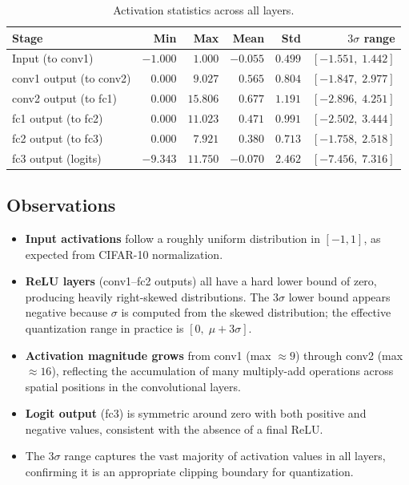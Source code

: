 \documentclass[11pt, letterpaper]{article}
\begin{document}
\begin{table}[H]
  \centering
  \caption{Activation statistics across all layers.}
  \label{tab:activations}
  \begin{tabular}{lrrrrr}
    \toprule
    \textbf{Stage} & \textbf{Min} & \textbf{Max}
                   & \textbf{Mean} & \textbf{Std}
                   & \textbf{$3\sigma$ range} \\
    \midrule
    Input (to conv1)         & $-1.000$ & $1.000$  & $-0.055$ & $0.499$ & $[-1.551,\;1.442]$ \\
    conv1 output (to conv2)  & $0.000$  & $9.027$  & $0.565$  & $0.804$ & $[-1.847,\;2.977]$ \\
    conv2 output (to fc1)    & $0.000$  & $15.806$ & $0.677$  & $1.191$ & $[-2.896,\;4.251]$ \\
    fc1 output (to fc2)      & $0.000$  & $11.023$ & $0.471$  & $0.991$ & $[-2.502,\;3.444]$ \\
    fc2 output (to fc3)      & $0.000$  & $7.921$  & $0.380$  & $0.713$ & $[-1.758,\;2.518]$ \\
    fc3 output (logits)      & $-9.343$ & $11.750$ & $-0.070$ & $2.462$ & $[-7.456,\;7.316]$ \\
    \bottomrule
  \end{tabular}
\end{table}

\subsection{Observations}
\begin{itemize}
  \item \textbf{Input activations} follow a roughly uniform distribution in $[-1,1]$,
        as expected from CIFAR-10 normalization.
  \item \textbf{ReLU layers} (conv1--fc2 outputs) all have a hard lower bound of zero,
        producing heavily right-skewed distributions. The $3\sigma$ lower bound appears
        negative because $\sigma$ is computed from the skewed distribution; the effective
        quantization range in practice is $[0,\;\mu+3\sigma]$.
  \item \textbf{Activation magnitude grows} from conv1 (max $\approx9$) through conv2
        (max $\approx16$), reflecting the accumulation of many multiply-add operations
        across spatial positions in the convolutional layers.
  \item \textbf{Logit output} (fc3) is symmetric around zero with both positive and
        negative values, consistent with the absence of a final ReLU.
  \item The $3\sigma$ range captures the vast majority of activation values in all layers,
        confirming it is an appropriate clipping boundary for quantization.
\end{itemize}
\end{document}

